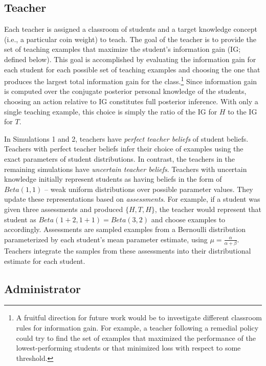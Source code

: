 \documentclass[10pt, letterpaper]{apa6}
\begin{document}
\subsection{Teacher}\label{teacher}

Each teacher is assigned a classroom of students and a target knowledge
concept (i.e., a particular coin weight) to teach. The goal of the
teacher is to provide the set of teaching examples that maximize the
student's information gain (IG; defined below). This goal is
accomplished by evaluating the information gain for each student for
each possible set of teaching examples and choosing the one that
produces the largest total information gain for the class.\footnote{A
  fruitful direction for future work would be to investigate different
  classroom rules for information gain. For example, a teacher following
  a remedial policy could try to find the set of examples that maximized
  the performance of the lowest-performing students or that minimized
  loss with respect to some threshold.} Since information gain is
computed over the conjugate posterior personal knowledge of the
students, choosing an action relative to IG constitutes full posterior
inference. With only a single teaching example, this choice is simply
the ratio of the IG for \(H\) to the IG for \(T\).

In Simulations 1 and 2, teachers have \emph{perfect teacher beliefs} of
student beliefs. Teachers with perfect teacher beliefs infer their
choice of examples using the exact parameters of student distributions.
In contrast, the teachers in the remaining simulations have
\emph{uncertain teacher beliefs}. Teachers with uncertain knowledge
initially represent students as having beliefs in the form of
\(Beta(1,1)\) -- weak uniform distributions over possible parameter
values. They update these representations based on \emph{assessments}.
For example, if a student was given three assessments and produced
\(\{H, T, H\}\), the teacher would represent that student as
\(Beta(1+2,1+1) = Beta(3,2)\) and choose examples to accordingly.
Assessments are sampled examples from a Bernoulli distribution
parameterized by each student's mean parameter estimate, using
\(\mu = \frac{\alpha}{\alpha + \beta}\). Teachers integrate the samples
from these assessments into their distributional estimate for each
student.

\subsection{Administrator}\label{administrator}
\end{document}
